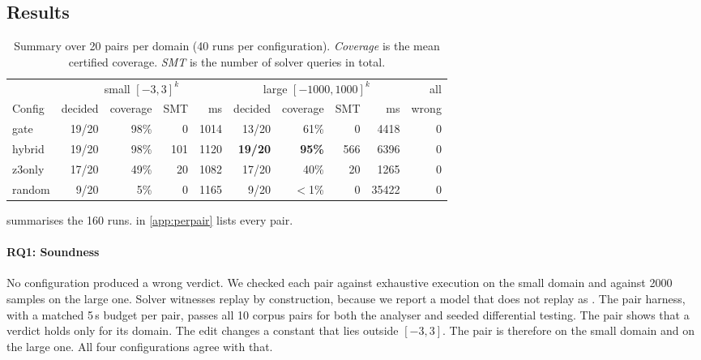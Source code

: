 \subsection{Results}
\label{sec:results}

\begin{table}
  \centering
  \caption{Summary over 20 pairs per domain (40 runs per configuration). \emph{Coverage}
  is the mean certified coverage. \emph{SMT} is the number of solver queries in total.}
  \label{tab:results}
  \small
  \begin{tabular}{@{}l rrrr rrrr r@{}} \toprule
    & \multicolumn{4}{c}{small $[-3,3]^k$} & \multicolumn{4}{c}{large $[-1000,1000]^k$} & all \\
    \cmidrule(lr){2-5} \cmidrule(lr){6-9}
    Config & decided & coverage & SMT & ms & decided & coverage & SMT & ms & wrong \\ \midrule
    gate   & 19/20 & 98\% & 0   & 1014 & 13/20 & 61\% & 0   & 4418  & 0 \\
    hybrid & 19/20 & 98\% & 101 & 1120 & \textbf{19/20} & \textbf{95\%} & 566 & 6396 & 0 \\
    z3only & 17/20 & 49\% & 20  & 1082 & 17/20 & 40\% & 20  & 1265  & 0 \\
    random & 9/20  & 5\%  & 0   & 1165 & 9/20  & $<$1\% & 0 & 35422 & 0 \\ \bottomrule
  \end{tabular}
\end{table}

 summarises the 160 runs.  in \cref{app:perpair} lists
every pair.

\paragraph{RQ1: Soundness}
No configuration produced a wrong verdict. We checked each pair against exhaustive execution
on the small domain and against 2000 samples on the large one. Solver witnesses replay by
construction, because we report a model that does not replay as \unk{}. The pair harness, with a
matched 5\,s budget per pair, passes all 10 corpus pairs for both the analyser and seeded
differential testing. The pair  shows that a verdict holds only for its
domain. The edit changes a constant that lies outside $[-3,3]$. The pair is therefore \pres{}
on the small domain and \chg{} on the large one. All four configurations agree with that.

